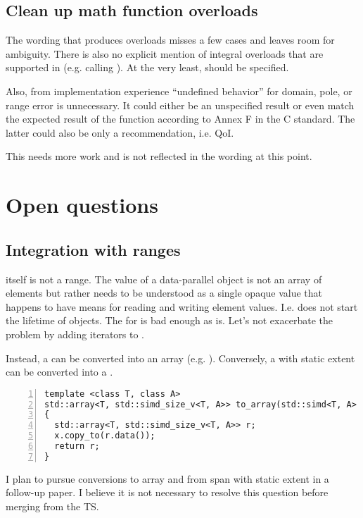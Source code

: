 \subsection{Clean up math function overloads}
The wording that produces  overloads misses a few cases and leaves room for ambiguity.
There is also no explicit mention of integral overloads that are supported in  (e.g.  calling ).
At the very least,  should be specified.

Also, from implementation experience ``undefined behavior'' for domain, pole, or range error is unnecessary.
It could either be an unspecified result or even match the expected result of the function according to Annex F in the C standard.
The latter could also be only a recommendation, i.e. QoI.

This needs more work and is not reflected in the wording at this point.


\section{Open questions}

\subsection{Integration with ranges}
 itself is not a range.
The value of a data-parallel object is not an array of elements but rather needs to be understood as a single opaque value that happens to have means for reading and writing element values.
I.e.  does not start the lifetime of  objects.
The  for  is bad enough as is.
Let's not exacerbate the problem by adding iterators to .

Instead, a  can be converted into an array (e.g. ).
Conversely, a \std{} with static extent can be converted into a \std{}.
\begin{lstlisting}[numbers=left,float={hbtp},label=lst:simdtoarray,caption={
  \code{simd} to \code{array} conversion
}]
template <class T, class A>
std::array<T, std::simd_size_v<T, A>> to_array(std::simd<T, A> x)
{
  std::array<T, std::simd_size_v<T, A>> r;
  x.copy_to(r.data());
  return r;
}
\end{lstlisting}

I plan to pursue conversions to array and from span with static extent in a follow-up paper.
I believe it is not necessary to resolve this question before merging  from the TS.

